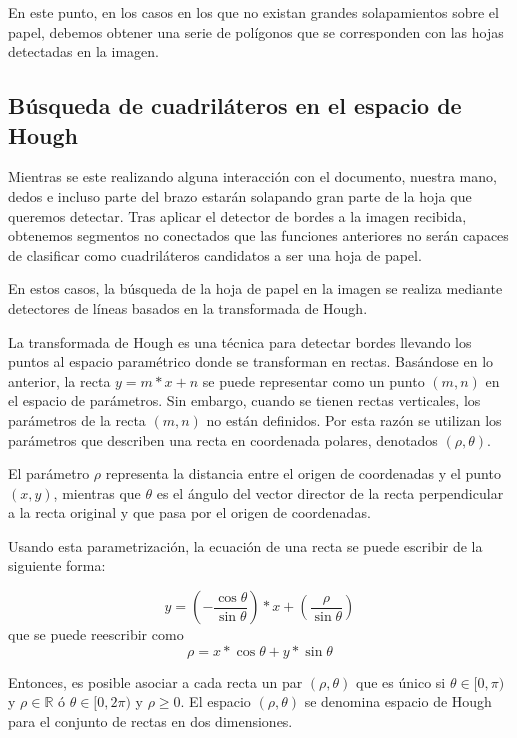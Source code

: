 En este punto, en los casos en los que no existan grandes solapamientos sobre el papel, debemos
obtener una serie de polígonos que se corresponden con las hojas detectadas en la imagen.

\subsection{Búsqueda de cuadriláteros en el espacio de Hough}
Mientras se este realizando alguna interacción con el documento, nuestra mano, dedos e incluso parte
del brazo estarán solapando gran parte de la hoja que queremos detectar. Tras aplicar el detector de
bordes a la imagen recibida, obtenemos segmentos no conectados que las funciones anteriores no serán
capaces de clasificar como cuadriláteros candidatos a ser una hoja de papel.

En estos casos, la búsqueda de la hoja de papel en la imagen se realiza mediante detectores de líneas basados
en la transformada de Hough.

La transformada de Hough es una técnica para detectar bordes llevando los puntos al espacio
paramétrico donde se transforman en rectas.
Basándose en lo anterior, la recta $y = m*x+n$ se puede representar como un punto $(m,n)$ en el
espacio de parámetros. Sin embargo, cuando se tienen rectas
verticales, los parámetros de la recta $(m,n)$  no están definidos. Por esta razón se utilizan los parámetros
que describen una recta en coordenada polares, denotados $(\rho,\theta)$.

El parámetro $\rho$ representa la distancia entre el origen de coordenadas y el punto$(x,y)$,
mientras que $\theta$ es el ángulo del vector director de la recta perpendicular a la recta original
y que pasa por el origen de coordenadas.

Usando esta parametrización, la ecuación de una recta se puede escribir de la siguiente forma:

\begin{equation}
y=(-\dfrac{\cos \theta}{\sin \theta}) * x + (\dfrac{\rho}{\sin \theta})
\end{equation}
que se puede reescribir como
\begin{equation}
\rho=x * \cos \theta + y * \sin \theta
\end{equation}

Entonces, es posible asociar a cada recta un par $(\rho,\theta)$ que es único si $\theta \in
[0,\pi)$ y $\rho \in \mathbb{R}$ ó $\theta \in [0,2\pi)$ y $\rho \geq 0$. El espacio
$(\rho,\theta)$ se denomina espacio de Hough para el conjunto de rectas en dos dimensiones.

